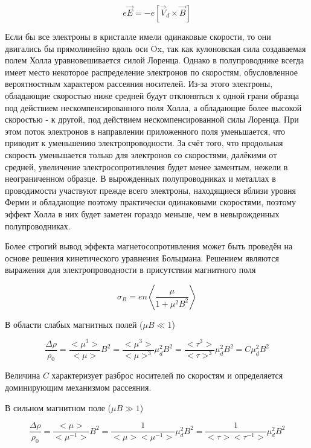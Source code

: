 \begin{equation}
e \overrightarrow{E} = -e \left[ \overrightarrow{V}_{d} \times \overrightarrow{B} \right]
\end{equation}

Если бы все электроны в кристалле имели одинаковые скорости, то они двигались бы прямолинейно вдоль оси Ox, так как кулоновская сила создаваемая полем Холла уравновешивается силой Лоренца. Однако в полупроводнике всегда имеет место некоторое распределение электронов по скоростям, обусловленное вероятностным характером рассеяния носителей. Из-за этого электроны, обладающие скоростью ниже средней будут отклоняться к одной грани образца под действием нескомпенсированного поля Холла, а обладающие более высокой скоростью - к другой, под действием нескомпенсированной силы Лоренца. При этом поток электронов в направлении приложенного поля уменьшается, что приводит к уменьшению электропроводности. За счёт того, что продольная скорость уменьшается только для электронов со скоростями, далёкими от средней, увеличение электросопротивления будет менее заментым, нежели в неограниченном образце. В вырожденных полупроводниках и металлах в проводимости участвуют прежде всего электроны, находящиеся вблизи уровня Ферми и обладающие поэтому практически одинаковыми скоростями, поэтому эффект Холла в них будет заметен гораздо меньше, чем в невырожденных полупроводниках.

Более строгий вывод эффекта магнетосопротивления может быть проведён на основе решения кинетического уравнения Больцмана. Решением являются выражения для электропроводности в присутствии магнитного поля

\begin{equation}
\sigma_{B} = e n \left< \frac{\mu}{1 + \mu^2 B^2} \right>
\end{equation}

В области слабых магнитных полей ($\mu B \ll 1$) 

\begin{equation}
\frac{\Delta \rho}{\rho_{0}} = \frac{<\mu^3>}{<\mu>} B^2 = \frac{<\mu^3>}{<\mu>^3}\mu^{2}_{d} B^2 = \frac{<\tau^3>}{<\tau>^3}\mu^{2}_{d} B^2 = C \mu^{2}_{d} B^2
\end{equation}

Величина $C$ характеризует разброс носителей по скоростям и определяется доминирующим механизмом рассеяния.

В сильном магнитном поле ($\mu B \gg 1$) 

\begin{equation}
\frac{\Delta \rho}{\rho_{0}} = \frac{<\mu>}{<\mu^{-1}>} B^2 = \frac{1}{<\mu><\mu^{-1}>} \mu_{d}^2 B^2 = \frac{1}{<\tau><\tau^{-1}>} \mu_{d}^2 B^2
\end{equation}

